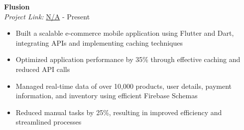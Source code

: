 \documentclass[a4paper,9pt]{extarticle}
\begin{document}
        \noindent
        \textbf{Flusion}\\
        \textit{Project Link:} \url{N/A} \hfill  - Present
        \begin{itemize}
        \item {Built a scalable e-commerce mobile application using Flutter and Dart, integrating APIs and implementing caching techniques}\item {Optimized application performance by 35\% through effective caching and reduced API calls}\item {Managed real-time data of over 10,000 products, user details, payment information, and inventory using efficient Firebase Schemas}\item {Reduced manual tasks by 25\%, resulting in improved efficiency and streamlined processes}\end{itemize}

    
\end{document}
